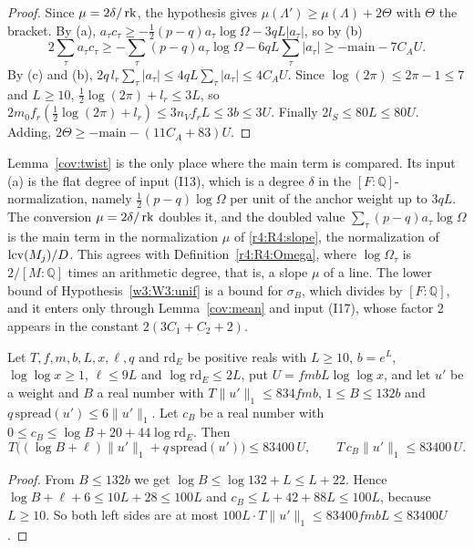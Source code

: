 \begin{proof}
Since $\mu=2\delta/\operatorname{rk}$, the hypothesis gives $\mu(\Lambda')\ge\mu(\Lambda)+2\Theta$ with $\Theta$ the bracket. By (a), $a_\tau c_\tau\ge-\frac12(p-q)a_\tau\log\Omega-3qL\lvert a_\tau\rvert$, so by (b)
\[
2\sum_\tau a_\tau c_\tau\ge-\sum_\tau(p-q)a_\tau\log\Omega-6qL\sum_\tau\lvert a_\tau\rvert\ge-\mathrm{main}-7C_AU .
\]
By (c) and (b), $2q\,l_r\sum_\tau\lvert a_\tau\rvert\le4qL\sum_\tau\lvert a_\tau\rvert\le4C_AU$. Since $\log(2\pi)\le2\pi-1\le7$ and $L\ge10$, $\frac12\log(2\pi)+l_r\le3L$, so $2m_0f_r(\frac12\log(2\pi)+l_r)\le3n_Vf_rL\le3b\le3U$. Finally $2l_S\le80L\le80U$. Adding, $2\Theta\ge-\mathrm{main}-(11C_A+83)U$.
\end{proof}

\begin{remark}\label{cov:factor2}
Lemma~\ref{cov:twist} is the only place where the main term is compared. Its input (a) is the flat degree of input (I13), which is a degree $\delta$ in the $[F:\mathbb Q]$-normalization, namely $\frac12(p-q)\log\Omega$ per unit of the anchor weight up to $3qL$. The conversion $\mu=2\delta/\operatorname{rk}$ doubles it, and the doubled value $\sum_\tau(p-q)a_\tau\log\Omega$ is the main term in the normalization $\mu$ of \eqref{r4:R4:slope}, the normalization of $\operatorname{lcv}(M_j)/D$. This agrees with Definition~\ref{r4:R4:Omega}, where $\log\Omega_\tau$ is $2/[M:\mathbb Q]$ times an arithmetic degree, that is, a slope $\mu$ of a line. The lower bound of Hypothesis~\ref{w3:W3:unif} is a bound for $\sigma_B$, which divides by $[F:\mathbb Q]$, and it enters only through Lemma~\ref{cov:mean} and input (I17), whose factor $2$ appears in the constant $2(3C_1+C_2+2)$.
\end{remark}

\begin{lemma}\label{cov:size}
Let $T,f,m,b,L,x,\ell,q$ and $\mathrm{rd}_E$ be positive reals with $L\ge10$, $b=e^L$, $\log\log x\ge1$, $\ell\le9L$ and $\log\mathrm{rd}_E\le2L$, put $U=fmbL\log\log x$, and let $u'$ be a weight and $B$ a real number with $T\lVert u'\rVert_1\le834fmb$, $1\le B\le132b$ and $q\,\mathrm{spread}(u')\le6\lVert u'\rVert_1$. Let $c_B$ be a real number with $0\le c_B\le\log B+20+44\log\mathrm{rd}_E$. Then
\[
T\big((\log B+\ell)\lVert u'\rVert_1+q\,\mathrm{spread}(u')\big)\le83400\,U,\qquad T\,c_B\lVert u'\rVert_1\le83400\,U.
\]
\end{lemma}

\begin{proof}
From $B\le132b$ we get $\log B\le\log132+L\le L+22$. Hence $\log B+\ell+6\le10L+28\le100L$ and $c_B\le L+42+88L\le100L$, because $L\ge10$. So both left sides are at most $100L\cdot T\lVert u'\rVert_1\le83400fmbL\le83400U$.
\end{proof}

